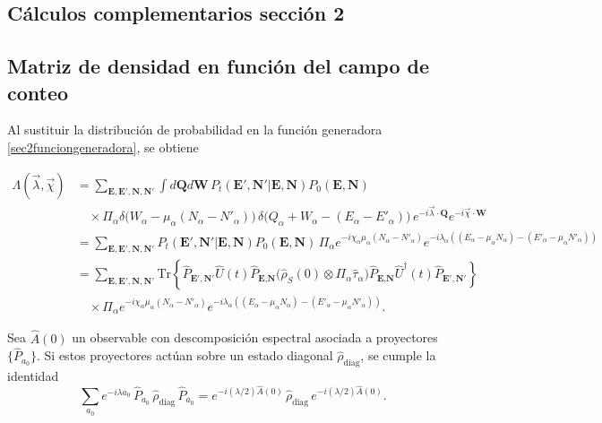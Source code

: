 \begin{appendixs}
	
	\section{Cálculos complementarios sección 2}

    \subsection{Matriz de densidad en función del campo de conteo}
\label{apendix:fcs1}

Al sustituir la distribución de probabilidad en la función generadora \eqref{sec2funciongeneradora}, se obtiene

\begin{align*}
    \Lambda(\vec{\lambda},\vec{\chi}) & = \sum_{\textbf{E},\textbf{E}',\textbf{N},\textbf{N}'} \int d\textbf{Q}d\textbf{W}\, P_{t}(\textbf{E}',\textbf{N}'|\textbf{E},\textbf{N}) P_{0}(\textbf{E},\textbf{N})  \\
    & \quad \times \Pi_{\alpha} \delta\!\big(W_{\alpha} - \mu_{\alpha}(N_{\alpha} - N'_{\alpha})\big) \,
      \delta\!\big(Q_{\alpha} + W_{\alpha} -(E_{\alpha} - E'_{\alpha})\big)\,
      e^{-i\vec{\lambda}\cdot \textbf{Q}} e^{-i\vec{\chi}\cdot \textbf{W}} \\
    & = \sum_{\textbf{E},\textbf{E}',\textbf{N},\textbf{N}'} P_{t}(\textbf{E}',\textbf{N}'|\textbf{E},\textbf{N}) P_{0}(\textbf{E},\textbf{N})\, 
        \Pi_{\alpha} e^{-i\chi_{\alpha}\mu_{\alpha}(N_{\alpha} - N'_{\alpha})}
        e^{-i\lambda_{\alpha}((E_{\alpha} -\mu_{\alpha}N_{\alpha}) - (E'_{\alpha} - \mu_{\alpha}N'_{\alpha})) }  \\
    & = \sum_{\textbf{E},\textbf{E}',\textbf{N},\textbf{N}'} \mathrm{Tr}\!\left\{\hat{P}_{\textbf{E}',\textbf{N}'}\hat{U}(t)\hat{P}_{\textbf{E},\textbf{N}}\big(\hat{\rho}_{S}(0)\otimes \Pi_{\alpha}\hat{\tau}_{\alpha}\big)\hat{P}_{\textbf{E},\textbf{N}}\hat{U}^{\dagger}(t)\hat{P}_{\textbf{E}',\textbf{N}'}\right\} \\
    & \quad \times \Pi_{\alpha} e^{-i\chi_{\alpha}\mu_{\alpha}(N_{\alpha} - N'_{\alpha})}
        e^{-i\lambda_{\alpha}((E_{\alpha} -\mu_{\alpha}N_{\alpha}) - (E'_{\alpha} - \mu_{\alpha}N'_{\alpha})) }.
\end{align*}

Sea $\hat{A}(0)$ un observable con descomposición espectral asociada a proyectores $\{\hat{P}_{a_0}\}$. Si estos proyectores actúan sobre un estado diagonal $\hat{\rho}_{\text{diag}}$, se cumple la identidad \cite{esposito2009nonequilibrium}
\begin{equation}
    \sum_{a_0} e^{-i\lambda a_0}\, \hat{P}_{a_0}\, \hat{\rho}_{\text{diag}}\, \hat{P}_{a_0} 
    = e^{-i(\lambda/2)\hat{A}(0)}\, \hat{\rho}_{\text{diag}}\, e^{-i(\lambda/2)\hat{A}(0)}.
    \label{apendixobservable}
\end{equation}


\end{appendixs}
